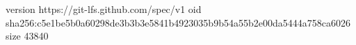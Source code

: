 version https://git-lfs.github.com/spec/v1
oid sha256:c5e1be5b0a60298de3b3b3e5841b4923035b9b54a55b2e00da5444a758ca6026
size 43840
